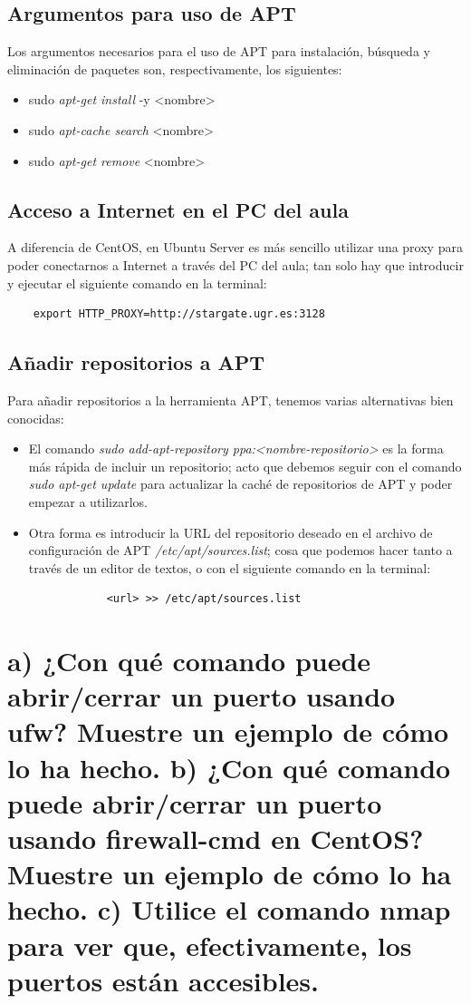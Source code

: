 	\subsection{Argumentos para uso de APT}
	Los argumentos necesarios para el uso de APT para instalación, búsqueda y eliminación de paquetes son, respectivamente, los siguientes:
	\begin{itemize}
		\item sudo \emph{apt-get install} -y <nombre>
		\item sudo \emph{apt-cache search} <nombre>
		\item sudo \emph{apt-get remove} <nombre>
	\end{itemize}

	\subsection{Acceso a Internet en el PC del aula}
	A diferencia de CentOS, en Ubuntu Server es más sencillo utilizar una proxy para poder conectarnos a Internet a través del PC del aula; tan solo hay que introducir y ejecutar el siguiente comando en la terminal:
	\begin{verbatim}
	export HTTP_PROXY=http://stargate.ugr.es:3128
	\end{verbatim}
	
	\subsection{Añadir repositorios a APT}
	Para añadir repositorios a la herramienta APT, tenemos varias alternativas bien conocidas:
	\begin{itemize}
		\item El comando \emph{sudo add-apt-repository ppa:<nombre-repositorio>} es la forma más rápida de incluir un repositorio; acto que debemos seguir con el comando \emph{sudo apt-get update} para actualizar la caché de repositorios de APT y poder empezar a utilizarlos.
		\item Otra forma es introducir la URL del repositorio deseado en el archivo de configuración de APT \emph{/etc/apt/sources.list}; cosa que podemos hacer tanto a través de un editor de textos, o con el siguiente comando en la terminal:
		\begin{verbatim}
			<url> >> /etc/apt/sources.list
		\end{verbatim} 
	\end{itemize}
	

\section{a) ¿Con qué comando puede abrir/cerrar un puerto usando ufw? Muestre un ejemplo de cómo lo ha hecho. b) ¿Con qué comando puede abrir/cerrar un puerto usando firewall-cmd en CentOS? Muestre un ejemplo de cómo lo ha hecho. c) Utilice el comando nmap para ver que, efectivamente, los puertos están accesibles.}


